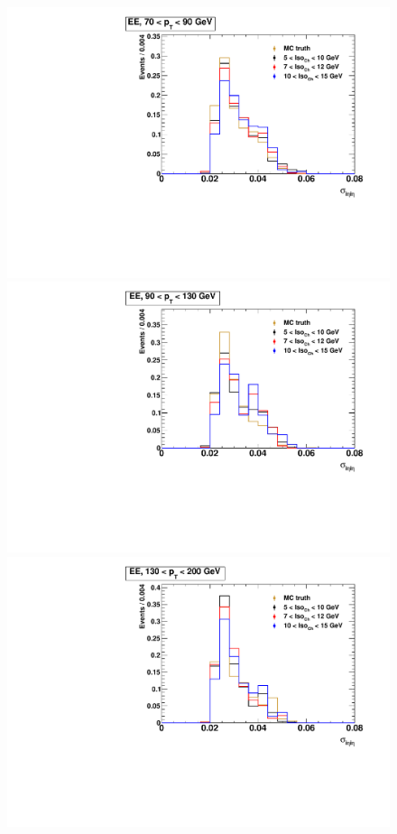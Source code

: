 \begin{figure}[!htbp]
\begin{multicols}{2}
		\includegraphics[scale=0.29]{figures/closure_test_fake_template_sieie_EE_pt70To90_sample_all.pdf} \\
		\includegraphics[scale=0.29]{figures/closure_test_fake_template_sieie_EE_pt90To130_sample_all.pdf} \\
		\includegraphics[scale=0.29]{figures/closure_test_fake_template_sieie_EE_pt130To200_sample_all.pdf} \\

\end{multicols}
\end{figure}
